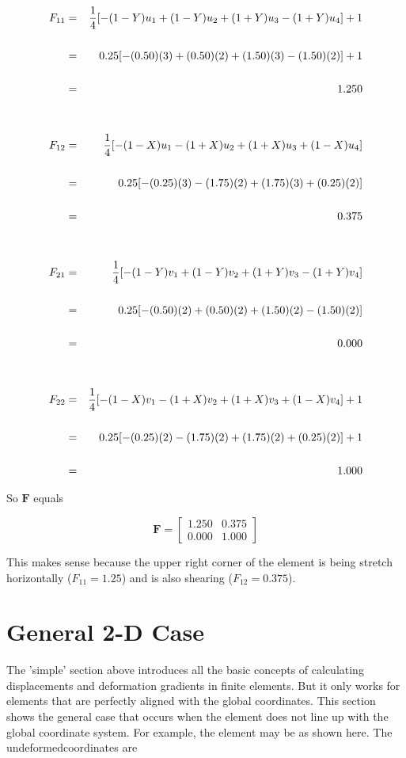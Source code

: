 \begin{eqnarray*}
F_{11} & = & {1 \over 4} [-(1-Y)u_1 + (1-Y)u_2 + (1+Y)u_3 - (1+Y)u_4] + 1 \\
\\
       & = & 0.25 [ -(0.50)(3) + (0.50)(2) + (1.50)(3) - (1.50)(2) ] + 1\\
\\
       & = & 1.250 \\
\\
\\
F_{12} & = & {1 \over 4} [-(1-X)u_1 - (1+X)u_2 + (1+X)u_3 + (1-X)u_4] \\
\\
       & = & 0.25 [ -(0.25)(3) - (1.75)(2) + (1.75)(3) + (0.25)(2) ] \\
\\
       & = & 0.375 \\
\\
\\
F_{21} & = & {1 \over 4} [-(1-Y)v_1 + (1-Y)v_2 + (1+Y)v_3 - (1+Y)v_4] \\
\\
       & = & 0.25 [ -(0.50)(2) + (0.50)(2) + (1.50)(2) - (1.50)(2) ] \\
\\
       & = & 0.000 \\
\\
\\
F_{22} & = & {1 \over 4} [-(1-X)v_1 - (1+X)v_2 + (1+X)v_3 + (1-X)v_4] + 1 \\
\\
       & = & 0.25 [ -(0.25)(2) - (1.75)(2) + (1.75)(2) + (0.25)(2) ] + 1\\
\\
       & = & 1.000
\end{eqnarray*}

So $ \mathbf{ F} $ equals

\begin{equation*}
\mathbf{ F} = 
\begin{bmatrix}
1.250 & 0.375 \\
0.000 & 1.000
\end{bmatrix}
\end{equation*}

This makes sense because the upper right corner of the element is being stretch horizontally ($ F_{11} = 1.25 $) and is also shearing ($ F_{12} = 0.375 $).

\section{General 2-D Case}
The 'simple' section above introduces all the basic concepts of calculating displacements and deformation gradients in finite elements. But it only works for elements that are perfectly aligned with the global coordinates.  This section shows the general case that occurs when the element does not line up with the global coordinate system. For example, the element may be as shown here. The undeformedcoordinates are

